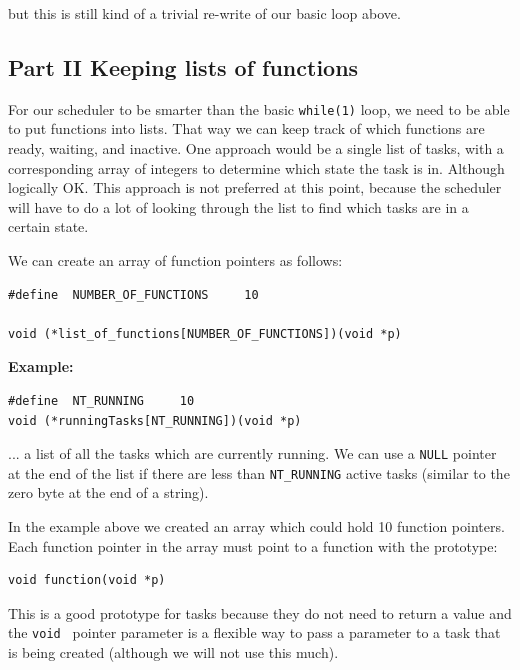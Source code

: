 but this is still kind of a trivial re-write of our basic loop above.   


\subsection{Part II   Keeping lists of functions }

For our scheduler to be smarter than the basic {\tt while(1)} loop, we need to be able to put functions into lists.   That way we can keep track of which functions are ready, 
waiting, and inactive.    One approach would be a single list of tasks, with a corresponding array of integers to determine which state the task is in. 
Although logically OK. This approach is not preferred at this point, because the scheduler will have to do a lot of looking through the list to find which tasks are in a certain state.  


We can create an array of function pointers as follows:

\begin{verbatim}
#define  NUMBER_OF_FUNCTIONS     10

void (*list_of_functions[NUMBER_OF_FUNCTIONS])(void *p)
\end{verbatim}

{\bf Example: }

\begin{verbatim}
#define  NT_RUNNING     10
void (*runningTasks[NT_RUNNING])(void *p)
\end{verbatim}
\noindent
... a list of all the tasks  which are currently running.  
We can use a {\tt NULL} pointer 
at the end of the list if there are less than {\tt NT\_RUNNING} active tasks 
(similar to the zero byte at the end of a string). 


In the example above we created an  array which could hold 10 function pointers.  Each function pointer in the array must point to a function with the prototype:

\begin{verbatim}
void function(void *p)
\end{verbatim}
This is a good prototype for tasks because they do not need to return a value and the  {\tt void } pointer parameter is a flexible way to pass a parameter to a task that is being created (although we will not use this much).
 

